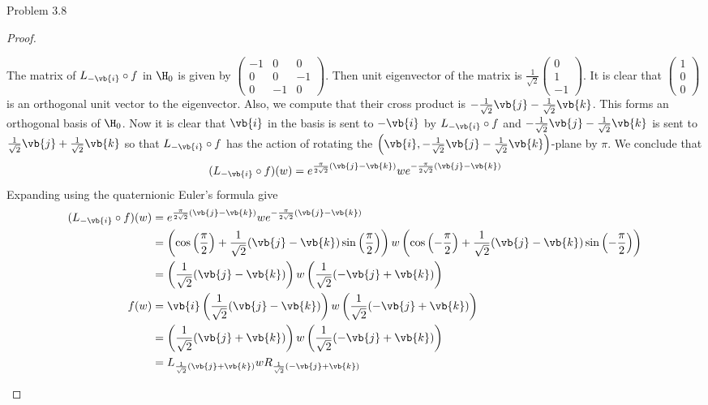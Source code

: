 \documentclass[a4paper]{article}
\begin{document}
\begin{ex}{Problem 3.8}{}
\begin{proof}
\begin{enumerate}
The matrix of $L_{-\vb{i}}\circ f$ in $\H_0$ is given by $\begin{pmatrix}
-1  & 0 & 0\\
0 & 0 & -1\\
0 & -1 & 0
\end{pmatrix}$. Then unit eigenvector of the matrix is $\frac{1}{\sqrt{2}}\begin{pmatrix}
0\\1\\-1
\end{pmatrix}$. It is clear that $\begin{pmatrix}
1\\0\\0
\end{pmatrix}$ is an orthogonal unit vector to the eigenvector. Also, we compute that their cross product is $-\frac{1}{\sqrt{2}}\vb{j}-\frac{1}{\sqrt{2}}\vb{k}$. This forms an orthogonal basis of $\H_0$. Now it is clear that $\vb{i}$ in the basis is sent to $-\vb{i}$ by $L_{-\vb{i}}\circ f$ and $-\frac{1}{\sqrt{2}}\vb{j}-\frac{1}{\sqrt{2}}\vb{k}$ is sent to $\frac{1}{\sqrt{2}}\vb{j}+\frac{1}{\sqrt{2}}\vb{k}$ so that $L_{-\vb{i}}\circ f$ has the action of rotating the $\left(\vb{i},-\frac{1}{\sqrt{2}}\vb{j}-\frac{1}{\sqrt{2}}\vb{k}\right)$-plane by $\pi$. We conclude that $$(L_{-\vb{i}}\circ f)(w)=e^{\frac{\pi}{2\sqrt{2}}(\vb{j}-\vb{k})}we^{-\frac{\pi}{2\sqrt{2}}(\vb{j}-\vb{k})}$$ Expanding using the quaternionic Euler's formula give 
\begin{align*}
(L_{-\vb{i}}\circ f)(w)&=e^{\frac{\pi}{2\sqrt{2}}(\vb{j}-\vb{k})}we^{-\frac{\pi}{2\sqrt{2}}(\vb{j}-\vb{k})}\\
&=\left(\cos\left(\frac{\pi}{2}\right)+\frac{1}{\sqrt{2}}(\vb{j}-\vb{k})\sin\left(\frac{\pi}{2}\right)\right)w\left(\cos\left(-\frac{\pi}{2}\right)+\frac{1}{\sqrt{2}}(\vb{j}-\vb{k})\sin\left(-\frac{\pi}{2}\right)\right)\\
&=\left(\frac{1}{\sqrt{2}}(\vb{j}-\vb{k})\right)w\left(\frac{1}{\sqrt{2}}(-\vb{j}+\vb{k})\right)\\
f(w)&=\vb{i}\left(\frac{1}{\sqrt{2}}(\vb{j}-\vb{k})\right)w\left(\frac{1}{\sqrt{2}}(-\vb{j}+\vb{k})\right)\\
&=\left(\frac{1}{\sqrt{2}}(\vb{j}+\vb{k})\right)w\left(\frac{1}{\sqrt{2}}(-\vb{j}+\vb{k})\right)\\
&=L_{\frac{1}{\sqrt{2}}(\vb{j}+\vb{k})}wR_{\frac{1}{\sqrt{2}}(-\vb{j}+\vb{k})}
\end{align*}
\end{enumerate}
\end{proof}
\end{ex}
\end{document}
